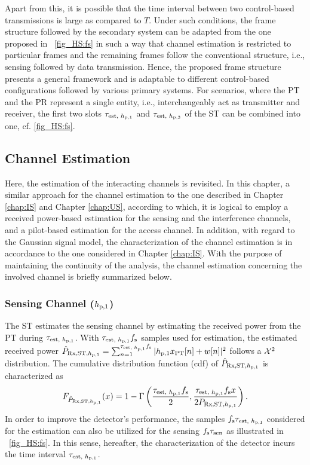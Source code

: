 Apart from this, it is possible that the time interval between two control-based transmissions is large as compared to $T$. Under such conditions, the frame structure followed by the secondary system can be adapted from the one proposed in \figurename~\ref{fig_HS:fs} in such a way that channel estimation is restricted to particular frames and the remaining frames follow the conventional structure, i.e., sensing followed by data transmission. Hence, the proposed frame structure presents a general framework and is adaptable to different control-based configurations followed by various primary systems. For scenarios, where the PT and the PR represent a single entity, i.e., interchangeably act as transmitter and receiver, the first two slots $\tau_{\text{est, $h_{\text{p,1}}$}}$ and $\tau_{\text{est, $h_{\text{p,3}}$}}$ of the ST can be combined into one, cf. \figurename\ref{fig_HS:fs}. 


\subsection{Channel Estimation}
Here, the estimation of the interacting channels is revisited. In this chapter, a similar approach for the channel estimation to the one described in Chapter \ref{chap:IS} and Chapter \ref{chap:US}, according to which, it is logical to employ a received power-based estimation for the sensing and the interference channels, and a pilot-based estimation for the access channel. In addition, with regard to the Gaussian signal model, the characterization of the channel estimation is in accordance to the one considered in Chapter \ref{chap:IS}. With the purpose of maintaining the continuity of the analysis, the channel estimation concerning the involved channel is briefly summarized below. 
\subsubsection*{Sensing Channel ($h_{\text{p,1}}$)}
The ST estimates the sensing channel by estimating the received power from the PT during $\tau_{\text{est, $h_{\text{p,1}}$}}$. With $\tau_{\text{est, $h_{\text{p,1}}$}} f_{\text{s}}$ samples used for estimation, the estimated received power $\hat{P}_{\text{Rx,ST,$h_{\text{p,1}}$}} = \sum_{n = 1}^{\tau_{\text{est, $h_{\text{p,1}}$}} f_{\text{s}}} |h_{\text{p,1}} x_{\text{PT}}[n] + w[n]|^2$ follows a $\cchi2$ distribution.
The cumulative distribution function (cdf) of $\hat{P}_{\text{Rx,ST,$h_{\text{p,1}}$}}$ is characterized as
\begin{align}
F_{\hat{P}_{\text{Rx,ST,$h_{\text{p,1}}$}}}(x) = 1 - \Gamma \left( \frac{\tau_{\text{est, $h_{\text{p,1}}$}} f_{\text{s}}}{2}, \frac{\tau_{\text{est, $h_{\text{p,1}}$}} f_{\text{s}} x}{2 P_{\text{Rx,ST,$h_{\text{p,1}}$}}} \right) \label{eq_HS:fprcvdstpt}.
\end{align}
In order to improve the detector's performance, the samples $f_{\text{s}} \tau_{\text{est, $h_{\text{p,1}}$}}$ considered for the estimation can also be utilized for the sensing $f_{\text{s}} \tau_{\text{sen}}$ as illustrated in \figurename~\ref{fig_HS:fs}. In this sense, hereafter, the characterization of the detector incurs the time interval $\tau_{\text{est, $h_{\text{p,1}}$}}$. 
  
